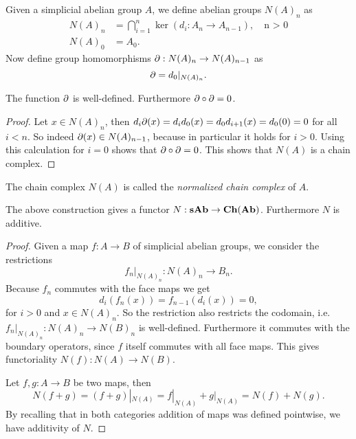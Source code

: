 Given a simplicial abelian group $A$, we define abelian groups $N(A)_n$ as
\begin{align*}
	N(A)_n &= \bigcap_{i=1}^{n} \ker(d_i: A_n \to A_{n-1}), \quad\text{n > 0} \\
	N(A)_0 &= A_0.
\end{align*}
Now define group homomorphisms $\partial: N(A)_n \to N(A)_{n-1}$ as
$$ \partial = d_0|_{N(A)_n}. $$
\begin{lemma}
	The function $ \partial $ is well-defined. Furthermore $ \partial \circ \partial = 0 $.
\end{lemma}
\begin{proof}
	Let $x \in N(A)_n$, then $d_i \partial(x) = d_i d_0(x) = d_0 d_{i+1}(x) = d_0 (0) = 0$ for all $i < n$. So indeed $\partial(x) \in N(A)_{n-1}$, because in particular it holds for $i > 0$. Using this calculation for $i = 0$ shows that $\partial \circ \partial = 0$. This shows that $N(A)$ is a chain complex.
\end{proof}

The chain complex $N(A)$ is called the \emph{normalized chain complex} of $A$.
\begin{lemma}
	The above construction gives a functor $N: \mathbf{sAb} \to \mathbf{Ch}(\mathbf{Ab})$. Furthermore $N$ is additive.
\end{lemma}
\begin{proof}
	Given a map $f: A \to B$ of simplicial abelian groups, we consider the restrictions
	$$ f_n |_{N(A)_n}: N(A)_n \to B_n. $$
	Because $f_n$ commutes with the face maps we get
	$$ d_i(f_n(x)) = f_{n-1}(d_i(x)) = 0, $$
	for $i>0$ and $x \in N(A)_n$. So the restriction also restricts the codomain, i.e. $f_n |_{N(A)_n}: N(A)_n \to N(B)_n$ is well-defined. Furthermore it commutes with the boundary operators, since $f$ itself commutes with all face maps. This gives functoriality $N(f): N(A) \to N(B)$.

	Let $f, g: A \to B$ be two maps, then
	$$ N(f+g) = (f+g)|_{N(A)} = f|_{N(A)} + g|_{N(A)} = N(f) + N(g). $$
	By recalling that in both categories addition of maps was defined pointwise, we have additivity of $N$.
\end{proof}

